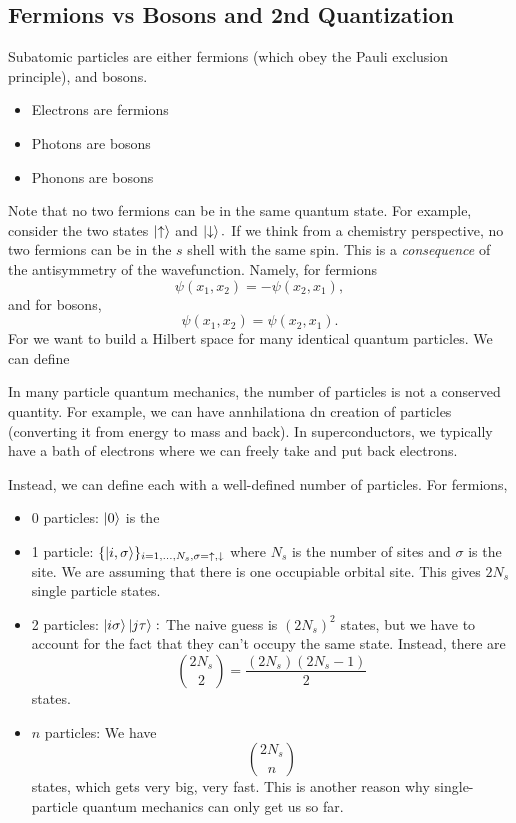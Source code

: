 \documentclass{article}
\numberwithin{equation}{section}
\begin{document}
\subsection{Fermions vs Bosons and 2nd Quantization}
Subatomic particles are either fermions (which obey the Pauli exclusion principle), and bosons.
\begin{itemize}
    \item Electrons are fermions
    \item Photons are bosons
    \item Phonons are bosons
\end{itemize}
Note that no two fermions can be in the same quantum state. For example, consider the two states $\ket{\uparrow}$ and $\ket{\downarrow}.$ If we think from a chemistry perspective, no two fermions can be in the $s$ shell with the same spin. This is a \textit{consequence} of the antisymmetry of the wavefunction. Namely, for fermions 
\begin{equation*}
    \psi(x_1,x_2) = -\psi(x_2,x_1),
\end{equation*}
and for bosons,
\begin{equation*}
    \psi(x_1,x_2) = \psi(x_2,x_1).
\end{equation*}
For  we want to build a Hilbert space for many identical quantum particles. We can define 
\begin{idea}
    In many particle quantum mechanics, the number of particles is not a conserved quantity. For example, we can have annhilationa dn creation of particles (converting it from energy to mass and back). In superconductors, we typically have a bath of electrons where we can freely take and put back electrons.
\end{idea}
Instead, we can define  each with a well-defined number of particles. For fermions,
\begin{itemize}
    \item 0 particles: $\ket{0}$ is the 
    \item 1 particle: $\{\ket{i,\sigma}\}_{i=1,\dots,N_s,\sigma=\uparrow,\downarrow}$ where $N_s$ is the number of sites and $\sigma$ is the site. We are assuming that there is one occupiable orbital site. This gives $2N_s$ single particle states.
    \item 2 particles: $\ket{i\sigma}\ket{j\tau}:$ The naive guess is $(2N_s)^2$ states, but we have to account for the fact that they can't occupy the same state. Instead, there are 
    \begin{equation*}
        \binom{2N_s}{2} = \frac{(2N_s)(2N_s-1)}{2} 
    \end{equation*}
    states.
    \item $n$ particles: We have 
    \begin{equation*}
        \binom{2N_s}{n}
    \end{equation*}
    states, which gets very big, very fast. This is another reason why single-particle quantum mechanics can only get us so far.
\end{itemize}
\end{document}
